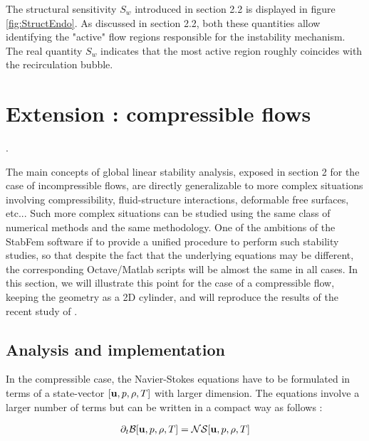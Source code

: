 \documentclass[twocolumn,10pt]{asme2ej}
\begin{document}
The structural sensitivity $S_w$ introduced in section 2.2 is displayed in figure \ref{fig:StructEndo}. As discussed in section 2.2, both these quantities allow identifying the "active" flow regions responsible for the instability mechanism. The real quantity $S_w$ indicates that the most active region roughly coincides with the recirculation bubble. 


\section{Extension : compressible flows}  
\label{sec:compressible}.

The main concepts of global linear stability analysis, exposed in section 2 for the case of incompressible flows, are directly generalizable to more complex situations involving compressibility, fluid-structure interactions, deformable free surfaces, etc... Such more complex situations can be studied using the same class of numerical methods and the same methodology. One of the ambitions of the StabFem software if to provide a unified procedure to perform such stability studies, so that despite the fact that the underlying equations may be different, the corresponding Octave/Matlab scripts will be almost the same in all cases. In this section, we will illustrate this point for the case of a compressible flow, keeping the geometry as a 2D cylinder, and will reproduce the results of the recent study of \cite{Fani2018}.

\subsection{Analysis and implementation}

In the compressible case, the Navier-Stokes equations have to be formulated in terms of a state-vector $[{\bf u},p,\rho,T]$ with larger dimension. 
The equations involve a larger number of terms but can be written in a compact way as follows :


\begin{eqnarray} \label{NSprimitive}
\partial_t {\cal B} [{\bf u},p,\rho,T] = {\cal NS}  [{\bf u},p,\rho,T] 
\end{eqnarray}
\end{document}
